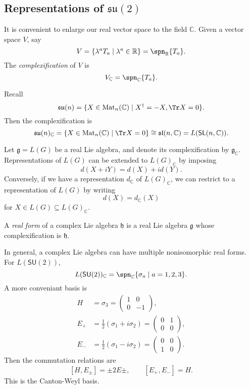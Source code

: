 \documentclass[12pt]{article}
\begin{document}
\subsection{Representations of \texorpdfstring{$\mathfrak{su}(2)$}{su(2)}}%
\label{sub:rep_su2}

It is convenient to enlarge our real vector space to the field $\mathbb{C}$. Given a vector space $V$, say
\[
	V = \{\lambda^a T_a \mid \lambda^a \in \mathbb{R}\} = \spn_{\mathbb{R}} \{T_a\}.
\]
The \emph{complexification} of $V$ is
\[
	V_{\mathbb{C}} = \spn_{\mathbb{C}}\{T_a\}.
\]

\begin{exbox}
	Recall
	\[
		\mathfrak{su}(n) = \{X \in \mathrm{Mat}_n(\mathbb{C}) \mid X^{\dagger} = -X, \Tr X = 0\}.
	\]
	Then the complexification is
	\[
		\mathfrak{su}(n)_{\mathbb{C}} = \{X \in \mathrm{Mat}_n(\mathbb{C}) \mid \Tr X = 0\} \cong \mathfrak{sl}(n, \mathbb{C}) = L(\mathsf{SL}(n, \mathbb{C})).
	\]
\end{exbox}

Let $\mathfrak{g} = L(G)$ be a real Lie algebra, and denote its complexification by $\mathfrak{g}_{\mathbb{C}}$. Representations of $L(G)$ can be extended to $L(G)_{\mathbb{C}}$ by imposing
\[
d(X+ iY) = d(X) + i d(Y).
\]
Conversely, if we have a representation $d_{\mathbb{C}}$ of $L(G)_{\mathbb{C}}$, we can restrict to a representation of $L(G)$ by writing
\[
d(X) = d_{\mathbb{C}}(X)
\]
for $X \in L(G) \subseteq L(G)_{\mathbb{C}}$.

\begin{definition}
	A \emph{real form} of a complex Lie algebra $\mathfrak{h}$ is a real Lie algebra $\mathfrak{g}$ whose complexification is $\mathfrak{h}$.
\end{definition}

In general, a complex Lie algebra can have multiple nonisomorphic real forms. For $L(\mathsf{SU}(2))$,
\[
L(\mathsf{SU}(2))_{\mathbb{C}} = \spn_{\mathbb{C}} \{\sigma_a \mid a = 1, 2, 3\}.
\]
A more conveniant basis is
\begin{align*}
	H &= \sigma_3 =
	\begin{pmatrix}
		1 & 0 \\ 0 & -1
	\end{pmatrix}
	, \\
	E_+ &= \frac{1}{2}(\sigma_1 + i \sigma_2) =
	\begin{pmatrix}
		0 & 1 \\ 0 & 0
	\end{pmatrix}, \\
	E_{-} &= \frac{1}{2}(\sigma_1 - i \sigma_2) =
	\begin{pmatrix}
		0 & 0 \\ 1 & 0
	\end{pmatrix}.
\end{align*}
Then the commutation relations are
\[
	[H, E_{\pm}] = \pm 2 E\pm, \qquad [E_+, E_-] = H.
\]
This is the Canton-Weyl basis.
\end{document}
